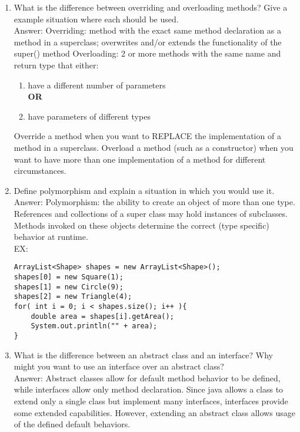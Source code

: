 \documentclass[11pt]{article}
\newenvironment{answer}{\large\lstset{basicstyle=\large}\color{white} \small{Answer:}\large}{}
\newenvironment{answer}{\large\lstset{basicstyle=\large}\color{red} \small{Answer:}\large}{}
\begin{document}
\begin{enumerate}
\item What is the difference between overriding and overloading methods?  Give a example situation where each should be used. \\
\begin{answer}
Overriding: method with the exact same method declaration as a method in a superclass; overwrites and/or extends the functionality of the super() method
Overloading: 2 or more methods with the same name and return type that either:
	\begin{enumerate}
	\item have a different number of parameters\\ \textbf{OR}
	\item have parameters of different types
	\end{enumerate}
Override a method when you want to REPLACE the implementation of a method in a superclass.  Overload a method (such as a constructor) when you want to have more than one implementation of a method for different circumstances.
\end{answer}



\item Define polymorphism and explain a situation in which you would use it. \\
\begin{answer}
Polymorphism: the ability to create an object of more than one type. References and collections of a super class may hold instances of subclasses. Methods invoked on these objects determine the correct (type specific) behavior at runtime. \\
EX:
		\begin{lstlisting}
ArrayList<Shape> shapes = new ArrayList<Shape>();
shapes[0] = new Square(1);
shapes[1] = new Circle(9);
shapes[2] = new Triangle(4);
for( int i = 0; i < shapes.size(); i++ ){ 
   	double area = shapes[i].getArea();
   	System.out.println("" + area);
}
        \end{lstlisting}
\end{answer}



\item What is the difference between an abstract class and an interface? Why might you want to use an interface over an abstract class? \\
\begin{answer}
Abstract classes allow for default method behavior to be defined, while interfaces allow only method declaration.  Since java allows a class to extend only a single class but implement many interfaces, interfaces provide some extended capabilities. However, extending an abstract class allows usage of the defined default behaviors. 
\end{answer}



\end{enumerate}
\end{document}
